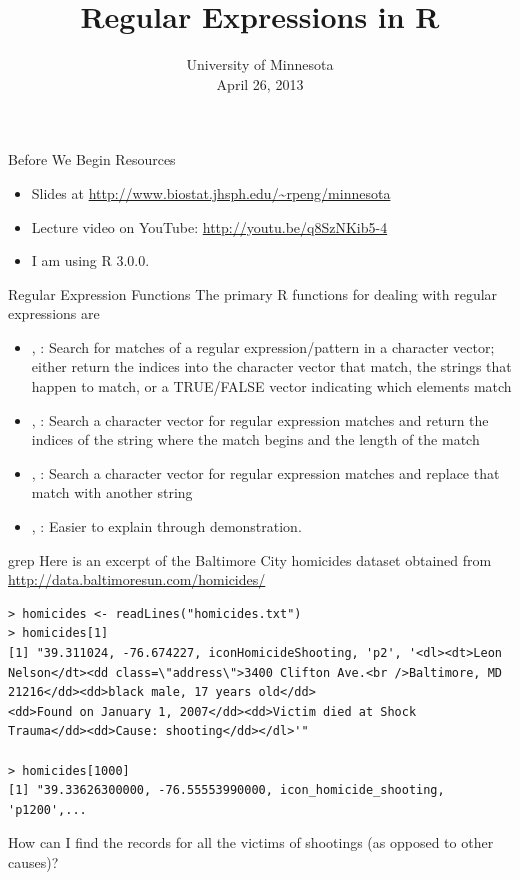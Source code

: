 \documentclass[aspectratio=169]{beamer}
\title[Regular Expressions in R]{Regular Expressions in R}
\date{University of Minnesota\\April 26, 2013}
\begin{document}
\begin{frame}
  \titlepage
\end{frame}

\begin{frame}{Before We Begin}
Resources
\begin{itemize}
\item Slides at \url{http://www.biostat.jhsph.edu/~rpeng/minnesota}
\item Lecture video on YouTube: \url{http://youtu.be/q8SzNKib5-4}
\item I am using R 3.0.0.
\end{itemize}
\end{frame}


\begin{frame}{Regular Expression Functions}
The primary R functions for dealing with regular expressions are
\begin{itemize}
\item {}, : Search for matches of a regular
  expression/pattern in a character vector; either return the indices
  into the character vector that match, the strings that happen to
  match, or a TRUE/FALSE vector indicating which elements match
\item {}, : Search a character vector for regular
  expression matches and return the indices of the string where the
  match begins and the length of the match
\item {}, : Search a character vector for regular
  expression matches and replace that match with another string
\item {}, : Easier to explain through demonstration.
\end{itemize}
\end{frame}

\begin{frame}[fragile]{grep}
Here is an excerpt of the Baltimore City homicides dataset obtained from \url{http://data.baltimoresun.com/homicides/}
\begin{verbatim}
> homicides <- readLines("homicides.txt")
> homicides[1]
[1] "39.311024, -76.674227, iconHomicideShooting, 'p2', '<dl><dt>Leon 
Nelson</dt><dd class=\"address\">3400 Clifton Ave.<br />Baltimore, MD 
21216</dd><dd>black male, 17 years old</dd>
<dd>Found on January 1, 2007</dd><dd>Victim died at Shock 
Trauma</dd><dd>Cause: shooting</dd></dl>'"

> homicides[1000]
[1] "39.33626300000, -76.55553990000, icon_homicide_shooting, 'p1200',...
\end{verbatim}
How can I find the records for all the victims of shootings (as
opposed to other causes)?
\end{frame}
\end{document}
